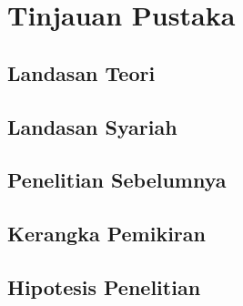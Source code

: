 \chapter{Tinjauan Pustaka}

\lipsum[1]

\section{Landasan Teori}

\lipsum[1]

\section{Landasan Syariah}

\lipsum[1]

\section{Penelitian Sebelumnya}

\lipsum[1]

\section{Kerangka Pemikiran}

\lipsum[1]

\section{Hipotesis Penelitian}

\lipsum[1]